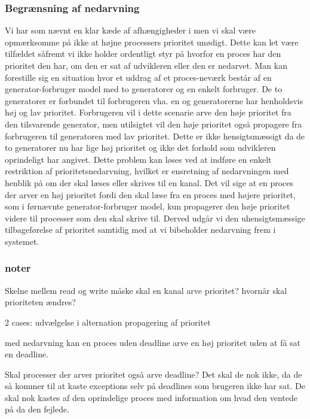 \subsubsection*{Begrænsning af nedarvning}
Vi har som nævnt en klar kæde af afhængigheder i \pycsp men vi skal være opmærksomme på ikke at højne processers prioritet unødigt. Dette kan let være tilfældet såfremt vi ikke holder ordentligt styr på hvorfor en proces har den prioritet den har, om den er sat af udvikleren eller den er nedarvet. Man kan forestille sig en situation hvor et uddrag af et proces-neværk består af en generator-forbruger model med to generatorer og en enkelt forbruger. De to generatorer er forbundet til forbrugeren vha. en  og generatorerne har henholdsvis høj og lav prioritet. Forbrugeren vil i dette scenarie arve den høje prioritet fra den tilsvarende generator, men utilsigtet vil den høje prioritet også propagere fra forbrugeren til generatoren med lav prioritet. Dette er ikke hensigtsmæssigt da de to generatorer nu har lige høj prioritet og ikke det forhold som udvikleren oprindeligt har angivet. Dette problem kan løses ved at indføre en enkelt restriktion af prioritetsnedarvning, hvilket er ensretning af nedarvningen med henblik på om der skal læses eller skrives til en kanal. Det vil sige at en proces der arver en høj prioritet fordi den skal læse fra en proces med højere prioritet, som i førnævnte generator-forbruger model, kun propagerer den høje prioritet videre til processer som den skal skrive til. Derved udgår vi den uhensigtsmæssige tilbageførelse af prioritet samtidig med at vi bibeholder nedarvning frem i systemet.

\subsubsection{noter}
Skelne mellem read og write
måske skal en kanal arve prioritet?
hvornår skal prioriteten ændres? 

2 cases:
udvælgelse i alternation
propagering af prioritet

med nedarvning kan en proces uden deadline arve en høj prioritet uden at få sat en deadline. 

Skal processer der arver prioritet også arve deadline? Det skal de nok ikke, da de så kommer til at kaste exceptions selv på deadlines som brugeren ikke har sat. De skal nok kastes af den oprindelige proces med information om hvad den ventede på da den fejlede. 

